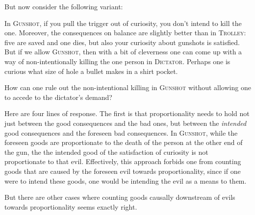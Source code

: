 But now consider the following variant:

    
In \textsc{Gunshot}, if you pull the trigger out of curiosity, you don't intend to kill the one. Moreover, the consequences
on balance are slightly better than in \textsc{Trolley}: five are saved and one dies, but also your curiosity about gunshots is
satisfied. But if we allow \textsc{Gunshot}, then with a bit of cleverness one can come up with a way of non-intentionally
killing the one person in \textsc{Dictator}. Perhaps one is curious what size of hole a bullet makes in a shirt pocket. 

How can one rule out the non-intentional killing in \textsc{Gunshot} without allowing one to accede to the dictator's demand? 

Here are four lines of response. The first is that proportionality needs to hold not just between the good consequences and
the bad ones, but between the \textit{intended} good consequences and the foreseen bad consequences. In \textsc{Gunshot},
while the foreseen goods are proportionate to the death of the person at the other end of the gun, the the intended good
of the satisfaction of curiosity is not proportionate to that evil. Effectively, this approach forbids one from counting
goods that are caused by the foreseen evil towards proportionality, since if one were to intend these goods, one would be
intending the evil as a means to them.

But there are other cases where counting goods causally downstream of evils towards proportionality seems exactly right. 

    
